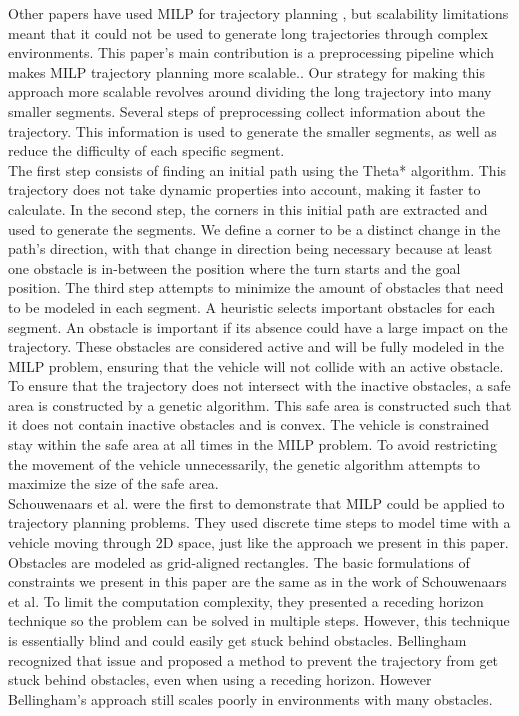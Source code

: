 Other papers have used MILP for trajectory planning \cite{Schouwenaars2001}, but scalability limitations meant that it could not be used to generate long trajectories through complex environments. This paper's main contribution is a preprocessing pipeline which makes MILP trajectory planning more scalable.. Our strategy for making this approach more scalable revolves around dividing the long trajectory into many smaller segments. Several steps of preprocessing collect information about the trajectory. This information is used to generate the smaller segments, as well as reduce the difficulty of each specific segment. \\

The first step consists of finding an initial path using the Theta* algorithm. This trajectory does not take dynamic properties into account, making it faster to calculate. In the second step, the corners in this initial path are extracted and used to generate the segments. We define a corner to be a distinct change in the path's direction, with that change in direction being necessary because at least one obstacle is in-between the position where the turn starts and the goal position. The third step attempts to minimize the amount of obstacles that need to be modeled in each segment. A heuristic selects important obstacles for each segment. An obstacle is important if its absence could have a large impact on the trajectory. These obstacles are considered active and will be fully modeled in the MILP problem, ensuring that the vehicle will not collide with an active obstacle.\\ 
To ensure that the trajectory does not intersect with the inactive obstacles, a safe area is constructed by a genetic algorithm. This safe area is constructed such that it does not contain inactive obstacles and is convex. The vehicle is constrained stay within the safe area at all times in the MILP problem. To avoid restricting the movement of the vehicle unnecessarily, the genetic algorithm attempts to maximize the size of the safe area.\\

Schouwenaars et al. \cite{Schouwenaars2001} were the first to demonstrate that MILP could be applied to trajectory planning problems. They used discrete time steps to model time with a vehicle moving through 2D space, just like the approach we present in this paper. Obstacles are modeled as grid-aligned rectangles. The basic formulations of constraints we present in this paper are the same as in the work of Schouwenaars et al. To limit the computation complexity, they presented a receding horizon technique so the problem can be solved in multiple steps. However, this technique is essentially blind and could easily get stuck behind obstacles. Bellingham\cite{Bellingham2002} recognized that issue and proposed a method to prevent the trajectory from get stuck behind obstacles, even when using a receding horizon. However Bellingham's approach still scales poorly in environments with many obstacles.\\

